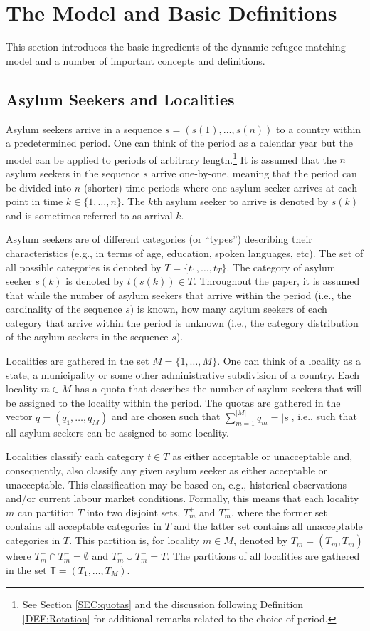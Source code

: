 \documentclass[12pt,fleqn]{article}
\begin{document}
\section{The Model and Basic Definitions}\label{SEC:Model}
This section introduces the basic ingredients of the dynamic refugee matching model and a number of important concepts and definitions.

\subsection{Asylum Seekers and Localities}
Asylum seekers arrive in a sequence $s=(s(1),\ldots,s(n))$ to a country within a predetermined period. One can think of the period as a calendar year but the model can be applied to periods of arbitrary length.\footnote{See Section \ref{SEC:quotas} and the discussion following Definition \ref{DEF:Rotation} for additional remarks related to the choice of period.} It is assumed that the $n$ asylum seekers in the sequence $s$ arrive one-by-one, meaning that the period can be divided into $n$ (shorter) time periods where one asylum seeker arrives at each point in time $k\in\{1,\ldots,n\}$. The $k$th asylum seeker to arrive is denoted by $s(k)$ and is sometimes referred to as arrival $k$.

Asylum seekers are of different categories (or ``types'') describing their characteristics (e.g., in terms of age, education, spoken languages, etc). The set of all possible categories is denoted by $T=\{t_1,\ldots,t_T\}$. The category of asylum seeker $s(k)$ is denoted by $t(s(k))\in T$. Throughout the paper, it is assumed that while the number of asylum seekers that arrive within the period (i.e., the cardinality of the sequence $s$) is known, how many asylum seekers of each category that arrive within the period is unknown (i.e., the category distribution of the asylum seekers in the sequence $s$).

Localities are gathered in the set $M=\{1,\ldots,M\}$. One can think of a locality as a state, a municipality or some other administrative subdivision of a country. Each locality $m\in M$ has a quota that describes the number of asylum seekers that will be assigned to the locality within the period. The quotas are gathered in the vector $q=(q_1,\ldots, q_M)$ and are chosen such that $\sum_{m=1}^{|M|}q_m=|s|$, i.e., such that all asylum seekers can be assigned to some locality.

Localities classify each category $t\in T$ as either acceptable or unacceptable and, consequently, also classify any given asylum seeker as either acceptable or unacceptable. This classification may be based on, e.g., historical observations and/or current labour market conditions. Formally, this means that each locality $m$ can partition $T$ into two disjoint sets, $T^+_m$ and $T_m^-$, where the former set contains all acceptable categories in $T$ and the latter set contains all unacceptable categories in $T$. This partition is, for locality $m\in M$, denoted by $T_m=(T^+_m, T_m^-)$ where $T^+_m\cap T_m^-=\emptyset$ and $T^+_m\cup T_m^-=T$. The partitions of all localities are gathered in the set $\mathbb{T}=(T_1,\ldots,T_M)$.
\end{document}
